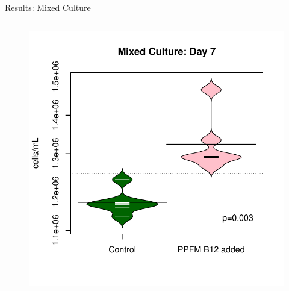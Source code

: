\documentclass[8pt]{beamer}\usepackage[]{graphicx}\usepackage[]{color}
\begin{document}
\begin{frame}{Results: Mixed Culture}
\begin{columns}[t]
\begin{figure}
                                \includegraphics[width=1\textwidth]{./figure/MixedCulture_beanopplot.pdf}
                                \end{figure}
        \end{columns}
\end{frame}
\end{document}
